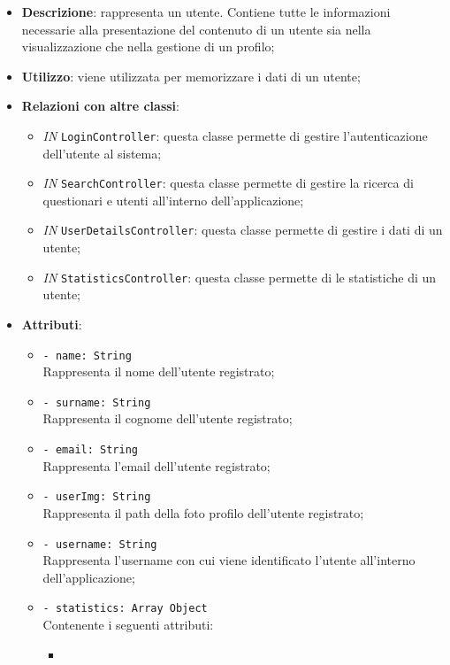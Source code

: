 		\begin{itemize}
			\item \textbf{Descrizione}: rappresenta un utente. Contiene tutte le informazioni necessarie alla
			presentazione del contenuto di un utente sia nella visualizzazione che nella gestione di un profilo;
			\item \textbf{Utilizzo}: viene utilizzata per memorizzare i dati di un utente;
			\item \textbf{Relazioni con altre classi}: 
			\begin{itemize}
				\item \textit{IN} \texttt{LoginController}: questa classe permette di gestire l'autenticazione dell'utente al sistema;
				\item \textit{IN} \texttt{SearchController}: questa classe permette di gestire la ricerca di questionari e utenti all'interno dell'applicazione;
				\item \textit{IN} \texttt{UserDetailsController}: questa classe permette di gestire i dati di un utente;
				\item \textit{IN} \texttt{StatisticsController}: questa classe permette di le statistiche di un utente;
			\end{itemize}
			\item \textbf{Attributi}: 
			\begin{itemize}
				\item 
				\texttt{- name: String}\\
				Rappresenta il nome  dell'utente registrato;
				\item 
				\texttt{- surname: String}\\
				Rappresenta il cognome  dell'utente registrato;
				\item 
				\texttt{- email: String}\\
				Rappresenta l'email  dell'utente registrato;
				\item 
				\texttt{- userImg: String}\\
				Rappresenta il path della foto profilo dell'utente registrato;
				\item 
				\texttt{- username: String}\\ 
				Rappresenta l'username con cui viene identificato l'utente all'interno dell'applicazione;		  		
				\item
				\texttt{- statistics: Array Object}\\
				Contenente i seguenti attributi:
				\begin{itemize}
					\item

\end{itemize}
\end{itemize}
\end{itemize}
